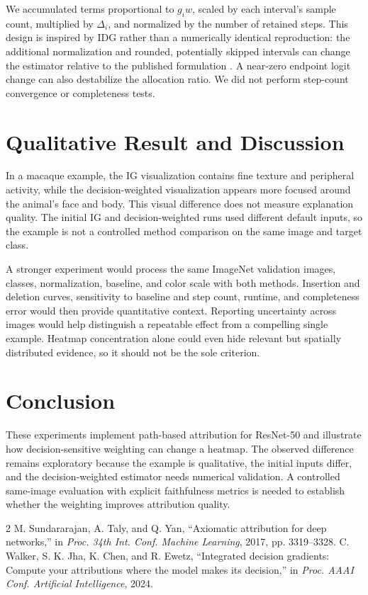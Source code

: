 \documentclass[conference]{IEEEtran}
\begin{document}
We accumulated terms proportional to $g_iw$, scaled by each interval's sample count, multiplied by $\Delta_i$, and normalized by the number of retained steps. This design is inspired by IDG rather than a numerically identical reproduction: the additional normalization and rounded, potentially skipped intervals can change the estimator relative to the published formulation \cite{idg}. A near-zero endpoint logit change can also destabilize the allocation ratio. We did not perform step-count convergence or completeness tests.

\balance
\section{Qualitative Result and Discussion}
In a macaque example, the IG visualization contains fine texture and peripheral activity, while the decision-weighted visualization appears more focused around the animal's face and body. This visual difference does not measure explanation quality. The initial IG and decision-weighted runs used different default inputs, so the example is not a controlled method comparison on the same image and target class.

A stronger experiment would process the same ImageNet validation images, classes, normalization, baseline, and color scale with both methods. Insertion and deletion curves, sensitivity to baseline and step count, runtime, and completeness error would then provide quantitative context. Reporting uncertainty across images would help distinguish a repeatable effect from a compelling single example. Heatmap concentration alone could even hide relevant but spatially distributed evidence, so it should not be the sole criterion.

\section{Conclusion}
These experiments implement path-based attribution for ResNet-50 and illustrate how decision-sensitive weighting can change a heatmap. The observed difference remains exploratory because the example is qualitative, the initial inputs differ, and the decision-weighted estimator needs numerical validation. A controlled same-image evaluation with explicit faithfulness metrics is needed to establish whether the weighting improves attribution quality.

\begin{thebibliography}{2}
 M. Sundararajan, A. Taly, and Q. Yan, ``Axiomatic attribution for deep networks,'' in \emph{Proc. 34th Int. Conf. Machine Learning}, 2017, pp. 3319--3328.
 C. Walker, S. K. Jha, K. Chen, and R. Ewetz, ``Integrated decision gradients: Compute your attributions where the model makes its decision,'' in \emph{Proc. AAAI Conf. Artificial Intelligence}, 2024.
\end{thebibliography}
\end{document}
